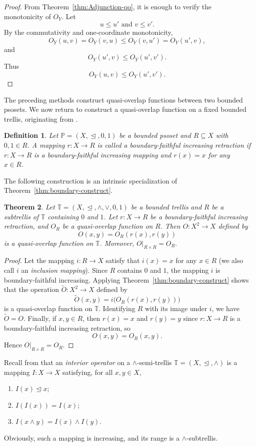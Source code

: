 \documentclass[preprint,12pt]{elsarticle}
\newtheorem{theorem}{Theorem}[section]
\newtheorem{definition}[theorem]{Definition}
\begin{document}
\begin{proof}
From Theorem~\ref{thm:Adjunction-qo}, it is enough to verify the monotonicity of $O_Y$. Let
$$
 u\leq u'
 \mbox{ and }
 v\leq v'.
$$
By the commutativity and one-coordinate monotonicity,
$$
 O_Y(u,v)
 =
 O_Y(v,u)
 \leq
 O_Y(v,u')
 =
 O_Y(u',v),
$$
and
$$
 O_Y(u',v)\leq O_Y(u',v').
$$
Thus
$$
 O_Y(u,v)\leq O_Y(u',v').
$$
\end{proof}

The preceding methods construct quasi-overlap functions between two bounded psosets. We now return to construct a quasi-overlap function on a fixed bounded trellis, originating from \cite{Monteiro2024}.
\begin{definition}\label{def:boundary-retraction}
\emph{Let $\mathbb{P}=(X,\trianglelefteq,0,1)$ be a bounded psoset and $R\subseteq X$ with $0,1\in R$. A mapping $r:X\to R$ is called a \emph{boundary-faithful increasing retraction} if $r:X\to R$ is a boundary-faithful increasing mapping and $r(x)=x$ for any $x\in R.$}
\end{definition}

The following construction is an intrinsic specialization of Theorem~\ref{thm:boundary-construct}.
\begin{theorem}\label{thm:retraction}
Let $\mathbb{T}=(X,\trianglelefteq,\wedge,\vee,0,1)$ be a bounded trellis and $R$ be a subtrellis of $\mathbb{T}$ containing $0$ and $1$. Let $r:X\to R$ be a boundary-faithful increasing retraction, and $O_R$ be a quasi-overlap function on $R$. Then $O:X^2\to X$ defined by
$$
 O(x,y)=O_R(r(x),r(y))
$$
is a quasi-overlap function on $\mathbb{T}$. Moreover,
$
 O|_{R\times R}=O_R.
$
\end{theorem}

\begin{proof}
Let the mapping $i:R\to X$ satisfy that $i(x)=x$ for any $x\in R$ (we also call $i$ an \emph{inclusion mapping}). Since $R$ contains $0$ and $1$, the mapping $i$ is boundary-faithful increasing. Applying Theorem~\ref{thm:boundary-construct} shows that the operation $\widetilde O:X^2\to X$ defined by
$$
 \widetilde O(x,y)
 =
 i\bigl(O_R(r(x),r(y))\bigr)
$$
is a quasi-overlap function on $\mathbb{T}$. Identifying $R$ with its image under $i$, we have $\widetilde O=O$. Finally, if $x,y\in R$, then $r(x)=x$ and $r(y)=y$ since $r:X\to R$ is a boundary-faithful increasing retraction, so
$$
 O(x,y)=O_R(x,y).
$$
Hence $O|_{R\times R}=O_R$.
\end{proof}

Recall from \cite{Zedam2023} that an \emph{interior operator} on a $\wedge$-semi-trellis $\mathbb{T}=(X,\trianglelefteq,\wedge)$ is a mapping $I:X\to X$ satisfying, for all $x,y\in X$,
\begin{enumerate}[label=(\roman*)]
\item $I(x)\trianglelefteq x$;
\item $I(I(x))=I(x)$;
\item $I(x\wedge y)=I(x)\wedge I(y)$.
\end{enumerate}
 Obviously, such a mapping is increasing, and its range is a $\wedge$-subtrellis.
\end{document}
